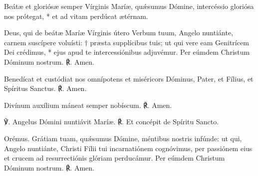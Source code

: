 \vfill


\dominusVobiscum

\vfill


Beátæ et gloriósæ semper Vírginis Maríæ, quǽsumus Dómine,
intercéssio gloriósa nos prótegat, *
et ad vitam perdúcat ætérnam. \hspace{0.5cm} \perDominum



Deus, qui de beátæ Maríæ Vírginis útero Verbum tuum,
Angelo nuntiánte, carnem suscípere voluísti: †
præsta supplícibus tuis; ut qui vere eam Genitrícem Dei crédimus, *
ejus apud te intercessiónibus adjuvémur.
Per eúmdem Christum Dóminum nostrum. 
℟. Amen.

\vfill

\dominusVobiscumRep

\benedicamusDomino

\vspace{5mm}

Benedícat et custódiat nos
omnípotens et miséricors Dóminus,
Pater, et Fílius, et Spíritus Sanctus.
℟. Amen.

\vspace{5mm}
\label{antiphonaefinales}


\vspace{5mm}

Divínum auxílium máneat semper nobíscum.
℟. Amen.

\vfill


\pagebreak




℣. Angelus Dómini nuntiávit Maríæ.
℟. Et concépit de Spíritu Sancto.

Orémus.
Grátiam tuam, quǽsumus Dómine, méntibus nostris infúnde:
ut qui, Angelo nuntiánte, Christi Fílii tui incarnatiónem cognóvimus,
per passiónem eius et crucem ad resurrectiónis glóriam perducámur.
Per eúmdem Christum Dóminum nostrum. 
℟. Amen.

